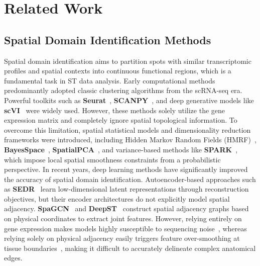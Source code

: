 \documentclass[lettersize,journal]{IEEEtran}
\begin{document}
\section{Related Work}
\label{sec:related_work}

\subsection{Spatial Domain Identification Methods}
Spatial domain identification aims to partition spots with similar transcriptomic profiles and spatial contexts into continuous functional regions, which is a fundamental task in ST data analysis. Early computational methods predominantly adopted classic clustering algorithms from the scRNA-seq era. Powerful toolkits such as \textbf{Seurat}~\cite{stuart2019comprehensive}, \textbf{SCANPY}~\cite{wolf2018scanpy}, and deep generative models like \textbf{scVI}~\cite{lopez2018deep} were widely used. However, these methods solely utilize the gene expression matrix and completely ignore spatial topological information. To overcome this limitation, spatial statistical models and dimensionality reduction frameworks were introduced, including Hidden Markov Random Fields (HMRF)~\cite{zhu2018hmrf}, \textbf{BayesSpace}~\cite{zhao2021bayesspace}, \textbf{SpatialPCA}~\cite{shang2022spatialpca}, and variance-based methods like \textbf{SPARK}~\cite{sun2020spark}, which impose local spatial smoothness constraints from a probabilistic perspective. In recent years, deep learning methods have significantly improved the accuracy of spatial domain identification. Autoencoder-based approaches such as \textbf{SEDR}~\cite{fu2021sedr} learn low-dimensional latent representations through reconstruction objectives, but their encoder architectures do not explicitly model spatial adjacency. \textbf{SpaGCN}~\cite{hu2021spagcn} and \textbf{DeepST}~\cite{xu2022deepst} construct spatial adjacency graphs based on physical coordinates to extract joint features. However, relying entirely on gene expression makes models highly susceptible to sequencing noise~\cite{qiu2020embracing}, whereas relying solely on physical adjacency easily triggers feature over-smoothing at tissue boundaries~\cite{li2018deeper}, making it difficult to accurately delineate complex anatomical edges.
\end{document}
